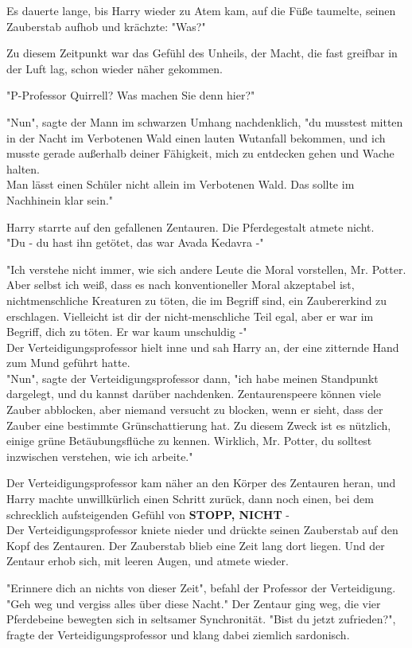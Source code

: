 {Es dauerte lange, bis Harry wieder zu Atem kam, auf die Füße taumelte, seinen Zauberstab aufhob und krächzte: "Was?"

Zu diesem Zeitpunkt war das Gefühl des Unheils, der Macht, die fast greifbar in der Luft lag, schon wieder näher gekommen.

"P-Professor Quirrell? Was machen Sie denn hier?"

"Nun", sagte der Mann im schwarzen Umhang nachdenklich, "du musstest mitten in der Nacht im Verbotenen Wald einen lauten Wutanfall bekommen, und ich musste gerade außerhalb deiner Fähigkeit, mich zu entdecken gehen und Wache halten.\\ Man lässt einen Schüler nicht allein im Verbotenen Wald. Das sollte im Nachhinein klar sein."

Harry starrte auf den gefallenen Zentauren. Die Pferdegestalt atmete nicht.\\ "Du - du hast ihn getötet, das war Avada Kedavra -"

"Ich verstehe nicht immer, wie sich andere Leute die Moral vorstellen, Mr. Potter. Aber selbst ich weiß, dass es nach konventioneller Moral akzeptabel ist, nichtmenschliche Kreaturen zu töten, die im Begriff sind, ein Zaubererkind zu erschlagen. Vielleicht ist dir der nicht-menschliche Teil egal, aber er war im Begriff, dich zu töten. Er war kaum unschuldig -"\\ Der Verteidigungsprofessor hielt inne und sah Harry an, der eine zitternde Hand zum Mund geführt hatte.\\ "Nun", sagte der Verteidigungsprofessor dann, "ich habe meinen Standpunkt dargelegt, und du kannst darüber nachdenken. Zentaurenspeere können viele Zauber abblocken, aber niemand versucht zu blocken, wenn er sieht, dass der Zauber eine bestimmte Grünschattierung hat. Zu diesem Zweck ist es nützlich, einige grüne Betäubungsflüche zu kennen. Wirklich, Mr. Potter, du solltest inzwischen verstehen, wie ich arbeite."

Der Verteidigungsprofessor kam näher an den Körper des Zentauren heran, und Harry machte unwillkürlich einen Schritt zurück, dann noch einen, bei dem schrecklich aufsteigenden Gefühl von \textbf{STOPP, NICHT} -\\ Der Verteidigungsprofessor kniete nieder und drückte seinen Zauberstab auf den Kopf des Zentauren. Der Zauberstab blieb eine Zeit lang dort liegen. Und der Zentaur erhob sich, mit leeren Augen, und atmete wieder.

"Erinnere dich an nichts von dieser Zeit", befahl der Professor der Verteidigung. "Geh weg und vergiss alles über diese Nacht." Der Zentaur ging weg, die vier Pferdebeine bewegten sich in seltsamer Synchronität. "Bist du jetzt zufrieden?", fragte der Verteidigungsprofessor und klang dabei ziemlich sardonisch.

}
